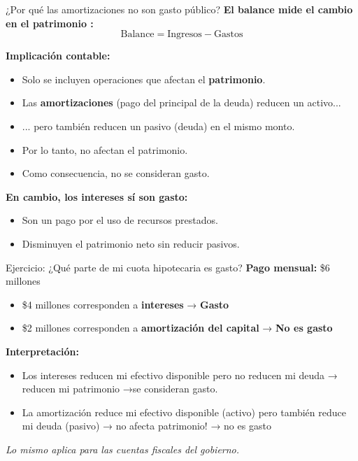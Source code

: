\begin{frame}{¿Por qué las amortizaciones no son gasto público?}
\textbf{El balance mide el cambio en el patrimonio :}
\begin{equation*}
\text{Balance} = \text{Ingresos} - \text{Gastos}
\end{equation*}

\vspace{1em}
\textbf{Implicación contable:}
\begin{itemize}
  \item Solo se incluyen operaciones que afectan el \textbf{patrimonio}.
  \item Las \textbf{amortizaciones} (pago del principal de la deuda) reducen un activo...
  \item ... pero también reducen un pasivo (deuda) en el mismo monto.
  \item Por lo tanto, no afectan el patrimonio.
  \item Como consecuencia, no se consideran gasto.
\end{itemize}
\end{frame}

\begin{frame}
\textbf{En cambio, los intereses sí son gasto:}
\begin{itemize}
  \item Son un pago por el uso de recursos prestados.
  \item Disminuyen el patrimonio neto sin reducir pasivos.
\end{itemize}
\end{frame}

\begin{frame}{Ejercicio: ¿Qué parte de mi cuota hipotecaria es gasto?}
\textbf{Pago mensual:} \$6 millones

\vspace{0.5em}
\begin{itemize}
  \item \$4 millones corresponden a \textbf{intereses} → \textbf{Gasto}
  \item \$2 millones corresponden a \textbf{amortización del capital} → \textbf{No es gasto}
\end{itemize}

\vspace{1em}
\textbf{Interpretación:}
\begin{itemize}
  \item Los intereses reducen mi efectivo disponible pero no reducen mi deuda → reducen mi patrimonio →se consideran gasto.
  \item La amortización reduce mi efectivo disponible (activo) pero también reduce mi deuda (pasivo) → no afecta patrimonio! → no es gasto 
\end{itemize}

\vspace{1em}
\textit{Lo mismo aplica para las cuentas fiscales del gobierno.}
\end{frame}

